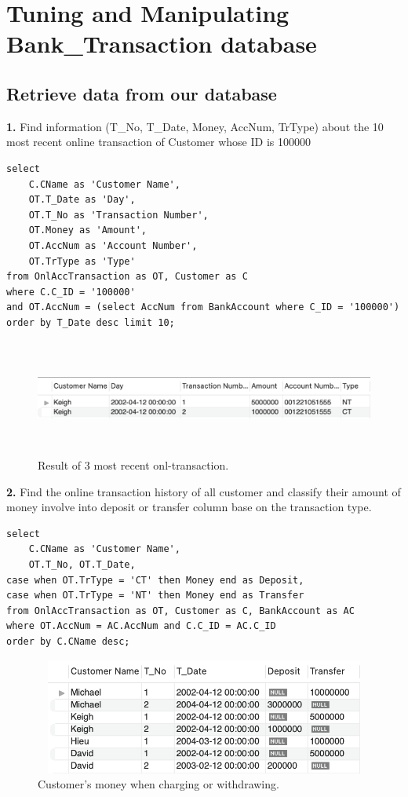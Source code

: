 \documentclass[12pt,a4paper]{article}
\begin{document}
 \section{Tuning and Manipulating Bank\_Transaction database}
 \subsection{Retrieve data from our database}
 
 \indent \textbf{1.} Find information (T\_No, T\_Date, Money, AccNum, TrType) about the 10 most recent online transaction of Customer whose ID is 100000
 
 \begin{verbatim}
select 
    C.CName as 'Customer Name',
    OT.T_Date as 'Day', 
    OT.T_No as 'Transaction Number', 
    OT.Money as 'Amount', 
    OT.AccNum as 'Account Number', 
    OT.TrType as 'Type'
from OnlAccTransaction as OT, Customer as C 
where C.C_ID = '100000' 
and OT.AccNum = (select AccNum from BankAccount where C_ID = '100000')
order by T_Date desc limit 10;
 \end{verbatim}
    \begin{figure}[H]
        \centering
        \includegraphics[width=5.5in,height=1.5in]{Picture/data1.png}
        \caption{Result of 3 most recent onl-transaction.}
    \end{figure}

\indent \textbf{2.} Find the online transaction history of all customer and classify their amount of money involve into deposit or transfer column base on the transaction type.

 \begin{verbatim}
select 
	C.CName as 'Customer Name',
	OT.T_No, OT.T_Date, 
case when OT.TrType = 'CT' then Money end as Deposit,
case when OT.TrType = 'NT' then Money end as Transfer
from OnlAccTransaction as OT, Customer as C, BankAccount as AC
where OT.AccNum = AC.AccNum and C.C_ID = AC.C_ID
order by C.CName desc;
 \end{verbatim}
 
 \begin{figure}[H]
        \centering
        \includegraphics[width=5in,height=1.5in]{Picture/data2.png}
        \caption{Customer's money when charging or withdrawing.}
\end{figure}
\end{document}
